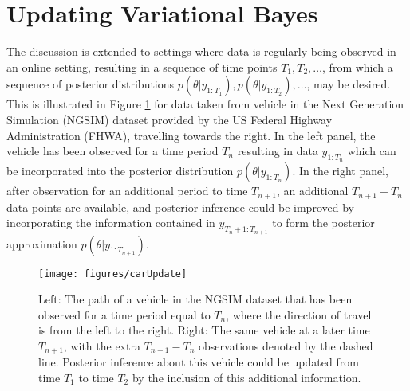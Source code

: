 \documentclass[12pt,a4paper]{article}\usepackage[]{graphicx}\usepackage[]{color}
\begin{document}
\section{Updating Variational Bayes}
\label{sec:UVB}

The discussion is extended to settings where data is regularly being observed in an online setting, resulting in a sequence of time points $T_1, T_2, \ldots$, from which a sequence of posterior distributions $p(\theta | y_{1:T_1}), p(\theta | y_{1:T_2}), \ldots$, may be desired.
\\

This is illustrated in Figure \ref{fig:updatetimeUpdate} for data taken from vehicle in the Next Generation Simulation (NGSIM) dataset provided by the US Federal Highway Administration (FHWA), travelling towards the right. In the left panel, the vehicle has been observed for a time period $T_{n}$ resulting in data $y_{1:T_{n}}$ which can be incorporated into the posterior distribution $p(\theta | y_{1:T_{n}})$. In the right panel, after observation for an additional period to time $T_{n+1}$, an additional $T_{n+1} - T_{n}$ data points are available, and posterior inference could be improved by incorporating the information contained in $y_{T_{n}+1:T_{n+1}}$ to form the posterior approximation $p(\theta | y_{1:T_{n+1}})$.

\begin{figure}[htbp]
\centering
\texttt{[image: figures/carUpdate]}
\caption{Left: The path of a vehicle in the NGSIM dataset that has been observed for a time period equal to $T_{n}$, where the direction of travel is from the left to the right. Right: The same vehicle at a later time $T_{n+1}$, with the extra $T_{n+1} - T_{n}$ observations denoted by the dashed line. Posterior inference about this vehicle could be updated from time $T_{1}$ to time $T_{2}$ by the inclusion of this additional information.}
\label{fig:updatetimeUpdate}
\end{figure}
\end{document}
